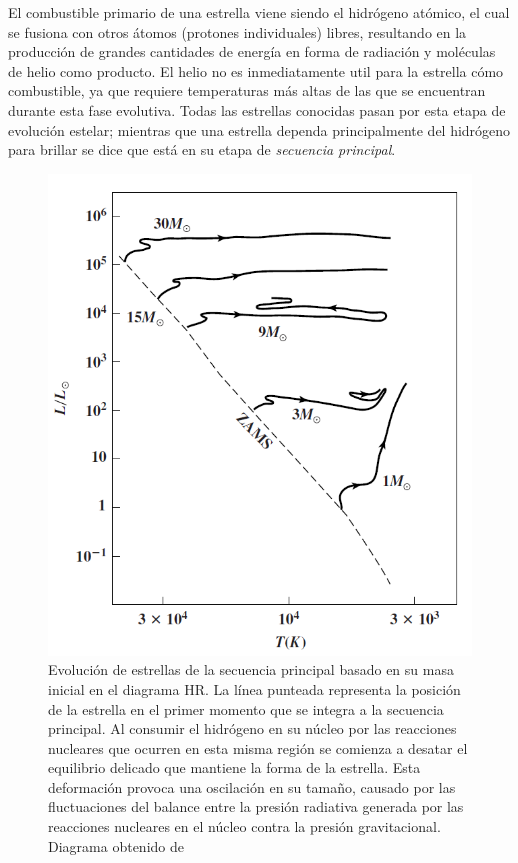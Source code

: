 El combustible primario de una estrella viene siendo el hidrógeno atómico, el
cual se fusiona con otros átomos (protones individuales) libres, resultando en
la producción de grandes cantidades de energía en forma de radiación y moléculas de helio como producto. El helio no es inmediatamente
util para la estrella cómo combustible, ya que requiere temperaturas más altas
de las que se encuentran durante esta fase evolutiva. Todas las estrellas conocidas pasan por esta etapa de evolución estelar;
mientras que una estrella dependa principalmente del hidrógeno para brillar se
dice que está en su etapa de \textit{secuencia principal}. 

\begin{figure}[!ht]
	\centering
	\includegraphics[scale=0.5]{Introduccion/Figures/Figura Evolucion_MS_Astronomy_Physical_Perspective.png}
	\caption{Evolución de estrellas de la secuencia principal basado en su masa
	inicial en el diagrama HR. La línea punteada representa la posición de la
	estrella en el primer momento que se integra a la secuencia principal. Al
	consumir el hidrógeno en su núcleo por las reacciones nucleares que ocurren
	en esta misma región se comienza a desatar el equilibrio delicado que
	mantiene la forma de la estrella. Esta deformación provoca una oscilación en
	su tamaño, causado por las fluctuaciones del balance entre la presión
	radiativa generada por las reacciones nucleares en el núcleo contra la
	presión gravitacional. Diagrama obtenido de \citet{astronomyPhysicalPerspective_stellarOldAgeChapter}}
	\label{evolucionMSEstrella}
\end{figure}
